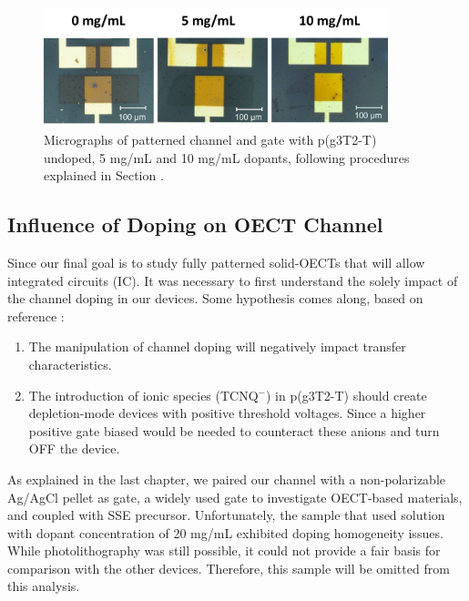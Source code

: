 \begin{figure}[ht]
  \centering
  \includegraphics[width=10cm]{Images/pdf/BigGateDevices.pdf}
  \caption[Micrographs of a patterned channel and gate p(g3T2-T) at different doping levels]{Micrographs of patterned channel and gate with p(g3T2-T) undoped, 5 mg/mL and 10 mg/mL dopants, following procedures explained in Section \label{subsec:photo}.}
  \label{fig:channel}
\end{figure}


\subsection{Influence of Doping on OECT Channel}
Since our final goal is to study fully patterned solid-OECTs that will allow integrated circuits (IC). It was necessary to first understand the solely impact of the channel doping in our devices. Some hypothesis comes along, based on reference \cite{tanTuningOrganicElectrochemical2022}:

\begin{enumerate}
\item The manipulation of channel doping will negatively impact transfer characteristics.
\item The introduction of ionic species (TCNQ$^{-}$) in p(g3T2-T) should create depletion-mode devices with positive threshold voltages. Since a higher positive gate biased would be needed to counteract these anions and turn OFF the device.
\end{enumerate}

As explained in the last chapter, we paired our channel with a non-polarizable Ag/AgCl pellet as gate, a widely used gate to investigate OECT-based materials, and coupled with SSE precursor. Unfortunately, the sample that used solution with dopant concentration of 20 mg/mL exhibited doping homogeneity issues. While photolithography was still possible, it could not provide a fair basis for comparison with the other devices. Therefore, this sample will be omitted from this analysis.

